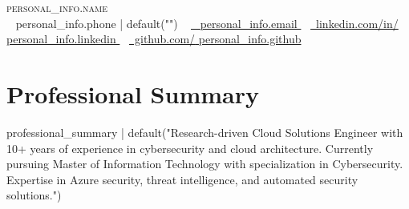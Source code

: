 \documentclass[letterpaper,11pt]{article}
\begin{document}
\begin{center}
    {\Huge \scshape {{ personal_info.name }}} \\ \vspace{1pt}
    \small \raisebox{-0.1\height}\faPhone\ {{ personal_info.phone | default("") }} ~ 
    \href{mailto:{{ personal_info.email }}}{\raisebox{-0.2\height}\faEnvelope\  {{ personal_info.email }}} ~ 
    \href{https://linkedin.com/in/{{ personal_info.linkedin }}}{\raisebox{-0.2\height}\faLinkedin\ linkedin.com/in/{{ personal_info.linkedin }}}  ~
    \href{https://github.com/{{ personal_info.github }}}{\raisebox{-0.2\height}\faGithub\ github.com/{{ personal_info.github }}}
    \vspace{-8pt}
\end{center}

\section{Professional Summary}
\small{
{{ professional_summary | default("Research-driven Cloud Solutions Engineer with 10+ years of experience in cybersecurity and cloud architecture. Currently pursuing Master of Information Technology with specialization in Cybersecurity. Expertise in Azure security, threat intelligence, and automated security solutions.") }}
}

\end{document}
